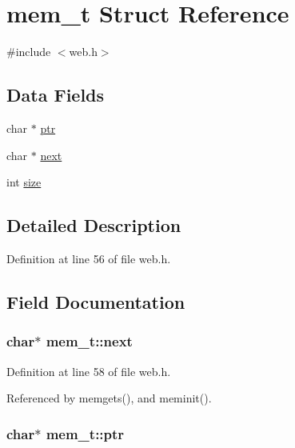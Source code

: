 \hypertarget{structmem__t}{}\section{mem\+\_\+t Struct Reference}
\label{structmem__t}


{\ttfamily \#include $<$web.\+h$>$}

\subsection*{Data Fields}
\begin{DoxyCompactItemize}
\item 
char $\ast$ \hyperlink{structmem__t_af9fd184846ee12236e952731fa592a74}{ptr}
\item 
char $\ast$ \hyperlink{structmem__t_a57b0ca2400c977d234c77e9d20a03c46}{next}
\item 
int \hyperlink{structmem__t_ab04d46fb2982c9a26a26244286c1b33b}{size}
\end{DoxyCompactItemize}


\subsection{Detailed Description}


Definition at line 56 of file web.\+h.



\subsection{Field Documentation}
\subsubsection[{\texorpdfstring{next}{next}}]{\setlength{\rightskip}{0pt plus 5cm}char$\ast$ mem\+\_\+t\+::next}\hypertarget{structmem__t_a57b0ca2400c977d234c77e9d20a03c46}{}\label{structmem__t_a57b0ca2400c977d234c77e9d20a03c46}


Definition at line 58 of file web.\+h.



Referenced by memgets(), and meminit().

\subsubsection[{\texorpdfstring{ptr}{ptr}}]{\setlength{\rightskip}{0pt plus 5cm}char$\ast$ mem\+\_\+t\+::ptr}\hypertarget{structmem__t_af9fd184846ee12236e952731fa592a74}{}\label{structmem__t_af9fd184846ee12236e952731fa592a74}


